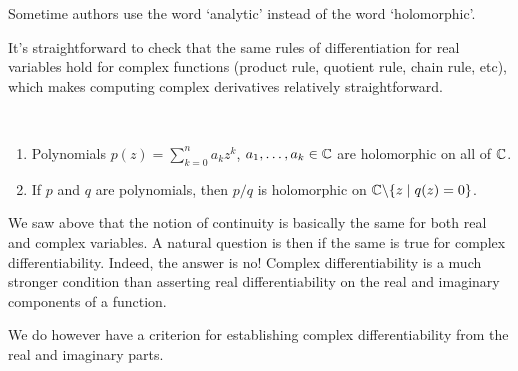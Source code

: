 \documentclass[a4paper]{scrartcl}
\begin{document}
\begin{remark}
    Sometime authors use the word `analytic' instead of the word `holomorphic'.
\end{remark}

It's straightforward to check that the same rules of differentiation for real variables hold for complex functions (product rule, quotient rule, chain rule, etc), which makes computing complex derivatives relatively straightforward.

\begin{example}~
    \vspace*{-1.5\baselineskip}
\begin{enumerate}[label=(\roman*)]
    \item Polynomials $p(z) = \sum_{k = 0}^n a_k z^k$, $a_1, \dots, a_k \in \mathbb{C}$ are holomorphic on all of $\mathbb{C}$.
    \item If $p$ and $q$ are polynomials, then $p/q$ is holomorphic on $\mathbb{C} \backslash \{z \mid q(z) = 0\}$.
\end{enumerate}
\end{example}
    
We saw above that the notion of continuity is basically the same for both real and complex variables. A natural question is then if the same is true for complex differentiability.
Indeed, the answer is no! Complex differentiability is a much stronger condition than asserting real differentiability on the real and imaginary components of a function.

We do however have a criterion for establishing complex differentiability from the real and imaginary parts.
\end{document}
